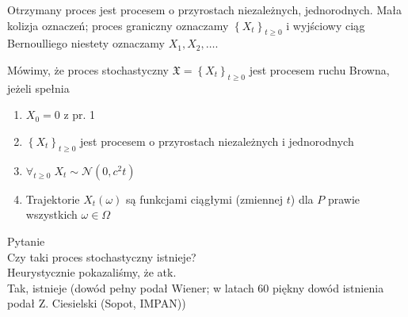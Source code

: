 Otrzymany proces jest procesem o przyrostach niezależnych, jednorodnych. Mała kolizja oznaczeń; proces graniczny oznaczamy $ \left\{X_t\right\}_{t\ge 0} $ i wyjściowy ciąg Bernoulliego niestety oznaczamy $ X_1,X_2,\dots  $.
\begin{defi}
Mówimy, że proces stochastyczny $ \mathfrak X=\left\{X_t\right\} _{t\ge 0}$ jest procesem ruchu Browna, jeżeli spełnia
\begin{enumerate}
\item $ X_0=0 $ z pr. 1
\item $ \left\{X_t\right\}_{t\ge 0} $ jest procesem o przyrostach niezależnych i jednorodnych
\item $ \forall_{t\ge0}\;X_t\sim \mathcal N(0,c^2t) $
\item Trajektorie $ X_t(\omega) $ są funkcjami ciągłymi (zmiennej $ t $) dla $ P $ prawie wszystkich $ \omega\in \Omega $
\end{enumerate}
\end{defi}
Pytanie\\
Czy taki proces stochastyczny istnieje?\\
Heurystycznie pokazaliśmy, że atk.\\
Tak, istnieje (dowód pełny podał Wiener; w latach 60 piękny dowód istnienia podał Z. Ciesielski (Sopot, IMPAN))


